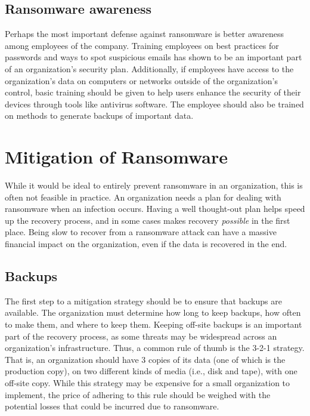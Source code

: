 \documentclass[11pt]{article}
\begin{document}
\subsection{Ransomware awareness}
\label{sec:org16c0d11}
Perhaps the most important defense against ransomware is better awareness among employees of the company. Training employees on best practices for passwords and ways to spot suspicious emails has shown to be an important part of an organization's security plan. Additionally, if employees have access to the organization's data on computers or networks outside of the organization's control, basic training should be given to help users enhance the security of their devices through tools like antivirus software. The employee should also be trained on methods to generate backups of important data.

\section{Mitigation of Ransomware}
\label{sec:orgc28a00d}
While it would be ideal to entirely prevent ransomware in an organization, this is often not feasible in practice. An organization needs a plan for dealing with ransomware when an infection occurs. Having a well thought-out plan helps speed up the recovery process, and in some cases makes recovery \emph{possible} in the first place. Being slow to recover from a ransomware attack can have a massive financial impact on the organization, even if the data is recovered in the end.

\subsection{Backups}
\label{sec:orgce22e20}
The first step to a mitigation strategy should be to ensure that backups are available. The organization must determine how long to keep backups, how often to make them, and where to keep them. Keeping off-site backups is an important part of the recovery process, as some threats may be widespread across an organization's infrastructure. Thus, a common rule of thumb is the 3-2-1 strategy. That is, an organization should have 3 copies of its data (one of which is the production copy), on two different kinds of media (i.e., disk and tape), with one off-site copy. While this strategy may be expensive for a small organization to implement, the price of adhering to this rule should be weighed with the potential losses that could be incurred due to ransomware.
\end{document}
